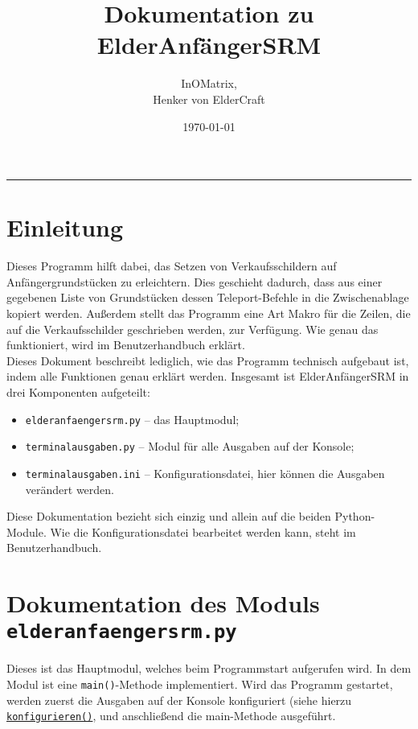 \documentclass{article}
\title{\textbf{Dokumentation zu ElderAnf\"angerSRM}}
\author{InOMatrix,\\ Henker von ElderCraft}
\date{\today}
\begin{document}
\maketitle
\tableofcontents
\bigskip

\hrule
\vfill

\section{Einleitung}
Dieses Programm hilft dabei, das Setzen von Verkaufsschildern auf Anf\"angergrundst\"ucken zu erleichtern. Dies geschieht dadurch, dass aus einer gegebenen Liste von Grundst\"ucken dessen Teleport-Befehle in die Zwischenablage kopiert werden. Au{\ss}erdem stellt das Programm eine Art Makro f\"ur die Zeilen, die auf die Verkaufsschilder geschrieben werden, zur Verf\"ugung. Wie genau das funktioniert, wird im Benutzerhandbuch erkl\"art.\\

Dieses Dokument beschreibt lediglich, wie das Programm technisch aufgebaut ist, indem alle Funktionen genau erkl\"art werden. Insgesamt ist ElderAnf\"angerSRM in drei Komponenten aufgeteilt:
\begin{itemize}
	\item \texttt{elderanfaengersrm.py} -- das Hauptmodul;
	\item \texttt{terminalausgaben.py} -- Modul f\"ur alle Ausgaben auf der Konsole;
	\item \texttt{terminalausgaben.ini} -- Konfigurationsdatei, hier k\"onnen die Ausgaben ver\"andert werden.
\end{itemize}
Diese Dokumentation bezieht sich einzig und allein auf die beiden Python-Module. Wie die Konfigurationsdatei bearbeitet werden kann, steht im Benutzerhandbuch.\newpage


\section{Dokumentation des Moduls \texttt{elderanfaengersrm.py}}
Dieses ist das Hauptmodul, welches beim Programmstart aufgerufen wird. In dem Modul ist eine \texttt{main()}-Methode implementiert. Wird das Programm gestartet, werden zuerst die Ausgaben auf der Konsole konfiguriert (siehe hierzu \hyperref[subsubsec:konfigurieren]{\texttt{konfigurieren()}}, und anschlie{\ss}end die main-Methode ausgef\"uhrt.\\[22pt]
\end{document}
